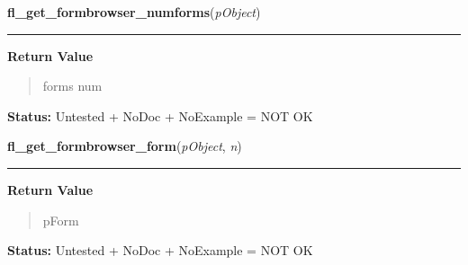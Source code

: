     \label{xformslib:library:fl_get_formbrowser_numforms}

    \vspace{0.5ex}

\hspace{.8\funcindent}\begin{boxedminipage}{\funcwidth}

    \raggedright \textbf{fl\_get\_formbrowser\_numforms}(\textit{pObject})

    \vspace{-1.5ex}

    \rule{\textwidth}{0.5\fboxrule}
\setlength{\parskip}{2ex}
\setlength{\parskip}{1ex}
      \textbf{Return Value}
    \vspace{-1ex}

      \begin{quote}
      forms num

      \end{quote}

\textbf{Status:} Untested + NoDoc + NoExample = NOT OK



    \end{boxedminipage}

    \label{xformslib:library:fl_get_formbrowser_form}

    \vspace{0.5ex}

\hspace{.8\funcindent}\begin{boxedminipage}{\funcwidth}

    \raggedright \textbf{fl\_get\_formbrowser\_form}(\textit{pObject}, \textit{n})

    \vspace{-1.5ex}

    \rule{\textwidth}{0.5\fboxrule}
\setlength{\parskip}{2ex}
\setlength{\parskip}{1ex}
      \textbf{Return Value}
    \vspace{-1ex}

      \begin{quote}
      pForm

      \end{quote}

\textbf{Status:} Untested + NoDoc + NoExample = NOT OK



    \end{boxedminipage}

